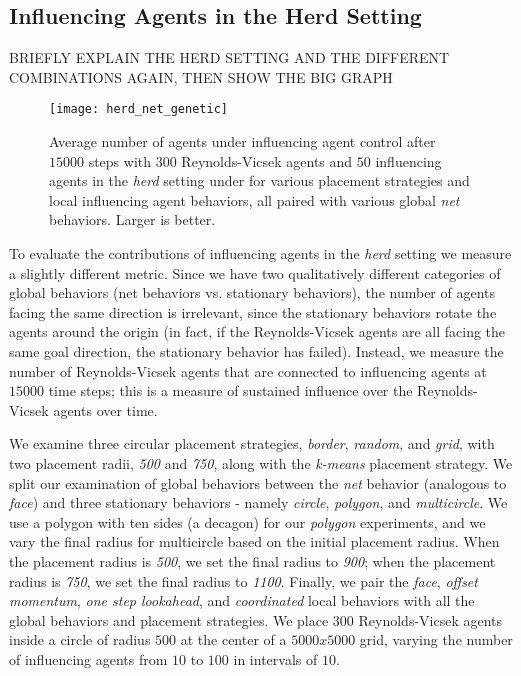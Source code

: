 \subsection{Influencing Agents in the Herd Setting}
BRIEFLY EXPLAIN THE HERD SETTING AND THE DIFFERENT COMBINATIONS AGAIN, THEN SHOW THE BIG GRAPH

\begin{figure}
    \centering
    \texttt{[image: herd\_net\_genetic]}
    \caption{Average number of agents under influencing agent control after $15000$
    steps with $300$ Reynolds-Vicsek agents and $50$ influencing agents in the
    \textit{herd} setting under for various placement strategies
    and local influencing agent behaviors, all paired with various global
    \textit{net} behaviors.
    Larger is better.}
    \label{fig:herd_net}
\end{figure}

To evaluate the contributions of influencing agents in the \textit{herd} setting
we measure a slightly different metric.
Since we have two qualitatively different categories of global behaviors (net
behaviors vs. stationary behaviors), the number of agents facing the same
direction is irrelevant, since the stationary behaviors rotate the agents around
the origin (in fact, if the Reynolds-Vicsek agents are all facing the same
goal direction, the stationary behavior has failed).
Instead, we measure the number of Reynolds-Vicsek agents that are connected to
influencing agents at $15000$ time steps; this is a measure of sustained
influence over the Reynolds-Vicsek agents over time.

We examine three circular placement strategies, \textit{border}, \textit{random},
and \textit{grid}, with two placement radii, \textit{500} and \textit{750}, along
with the \textit{k-means} placement strategy.
We split our examination of global behaviors between the \textit{net} behavior
(analogous to \textit{face}) and three stationary behaviors - namely
\textit{circle}, \textit{polygon}, and \textit{multicircle}.
We use a polygon with ten sides (a decagon) for our \textit{polygon} experiments,
and we vary the final radius for multicircle based on the initial placement
radius.
When the placement radius is \textit{500}, we set the final radius to
\textit{900}; when the placement radius is \textit{750}, we set the final radius
to \textit{1100}.
Finally, we pair the \textit{face}, \textit{offset momentum}, \textit{one step
lookahead}, and \textit{coordinated} local behaviors with all the global behaviors
and placement strategies.
We place $300$ Reynolds-Vicsek agents inside a circle of radius $500$ at the center
of a $5000x5000$ grid, varying the number of influencing agents from $10$ to $100$
in intervals of $10$.
